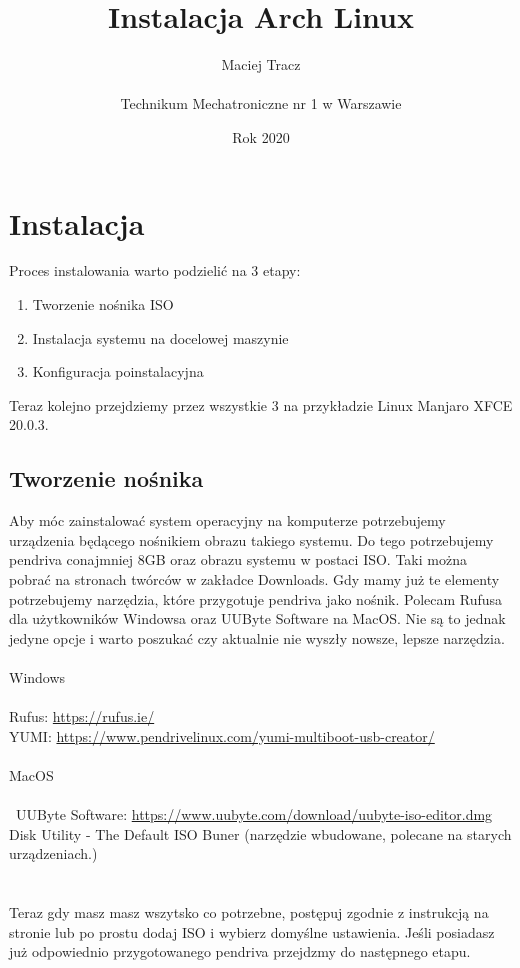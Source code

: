 \documentclass[10pt,a4paper]{article}
\begin{document}
\title{\Huge Instalacja Arch Linux}
\author{Maciej Tracz \\\\Technikum Mechatroniczne nr 1 w Warszawie}
\date{Rok 2020}
\maketitle

\section{Instalacja}
	
Proces instalowania warto podzielić na 3 etapy:
\begin{enumerate}
\item Tworzenie nośnika ISO
\item Instalacja systemu na docelowej maszynie
\item Konfiguracja poinstalacyjna\\
\end{enumerate}	
Teraz kolejno przejdziemy przez wszystkie 3 na przykładzie Linux Manjaro XFCE 20.0.3.
		\subsection{Tworzenie nośnika}
Aby móc zainstalować system operacyjny na komputerze potrzebujemy urządzenia będącego nośnikiem obrazu takiego systemu. Do tego potrzebujemy pendriva conajmniej 8GB oraz obrazu systemu w postaci ISO. Taki można pobrać na stronach twórców w zakładce Downloads. Gdy mamy już te elementy potrzebujemy narzędzia, które przygotuje pendriva jako nośnik. Polecam Rufusa dla użytkowników Windowsa oraz UUByte Software na MacOS. Nie są to jednak jedyne opcje i warto poszukać czy aktualnie nie wyszły nowsze, lepsze narzędzia.\\\\Windows\\\\Rufus: \url{https://rufus.ie/}\\ YUMI: \url{https://www.pendrivelinux.com/yumi-multiboot-usb-creator/}\\\\MacOS\\\\\ UUByte Software: \url{https://www.uubyte.com/download/uubyte-iso-editor.dmg}\\Disk Utility - The Default ISO Buner (narzędzie wbudowane, polecane na starych urządzeniach.)\\\\\\ Teraz gdy masz masz wszytsko co potrzebne, postępuj zgodnie z instrukcją na stronie lub po prostu dodaj ISO i wybierz domyślne ustawienia. Jeśli posiadasz już odpowiednio przygotowanego pendriva przejdzmy do następnego etapu.
\end{document}
